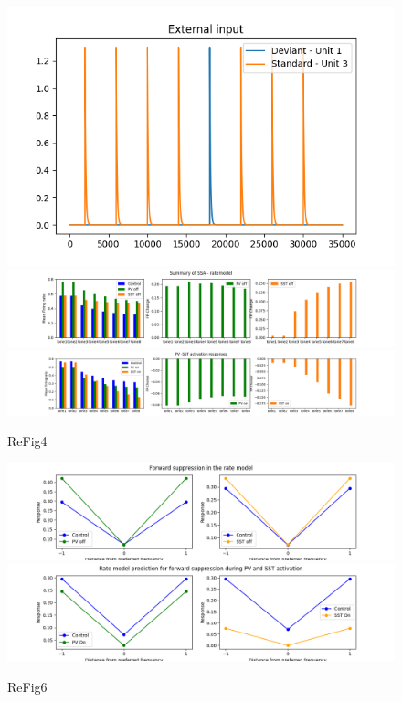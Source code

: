 \begin{figure}
 \includegraphics[width=\textwidth]{Figures/Fig4A}
 \includegraphics[width=\textwidth]{Figures/Fig4BDE}
 \includegraphics[width=\textwidth]{Figures/Fig4F}
 \caption{ReFig4}
\end{figure}

\begin{figure}
 \includegraphics[width=\textwidth]{Figures/Fig6BC}
 \includegraphics[width=\textwidth]{Figures/Fig6DE}
 \caption{ReFig6}
\end{figure}

